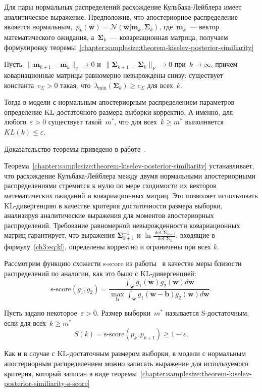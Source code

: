 Для пары нормальных распределений расхождение Кульбака-Лейблера имеет аналитическое выражение. Предположив, что апостериорное распределение является нормальным,~$p_k(\mathbf{w}) = \mathcal{N}\left(\mathbf{w}|\mathbf{m}_k, \mathbf{\Sigma}_k\right)$, где~$\mathbf{m}_k$~--- вектор математического ожидания, а~$\mathbf{\Sigma}_k$~--- ковариационная матрица, получаем формулировку теоремы~\ref{chapter:samplesize:theorem-kiselev-posterior-similiarity}

\begin{theorem}\label{chapter:samplesize:theorem-kiselev-posterior-similiarity}
    Пусть~$\|\mathbf{m}_{k+1} - \mathbf{m}_k\|_2 \to 0$ и~$\|\mathbf{\Sigma}_{k+1} - \mathbf{\Sigma}_k\|_{F}\to 0$ при~$k\to \infty$, причем ковариационные матрицы равномерно невырождены снизу: существует константа~$c_{\Sigma}>0$ такая, что~$\lambda_{\min}(\mathbf{\Sigma}_k)\ge c_{\Sigma}$ для всех~$k$.

    Тогда в модели с нормальным апостериорным распределением параметров определение KL-достаточного размера выборки корректно.
    А именно, для любого~$\varepsilon > 0$ существует такой~$m^*$, что для всех~$k\geqslant m^*$ выполняется~$KL(k)\leqslant\varepsilon$.
\end{theorem}
Доказательство теоремы приведено в работе~\cite{grabovoi2025sample727559461}.

Теорема~\ref{chapter:samplesize:theorem-kiselev-posterior-similiarity} устанавливает, что расхождение Кульбака-Лейблера между двумя нормальными апостериорными распределениями стремится к нулю по мере сходимости их векторов математических ожиданий и ковариационных матриц. Это позволяет использовать KL-дивергенцию в качестве критерия достаточности размера выборки, анализируя аналитические выражения для моментов апостериорных распределений. Требование равномерной невырожденности ковариационных матриц гарантирует, что выражения $\mathbf{\Sigma}_{k+1}^{-1}$ и $\ln\frac{\det\mathbf{\Sigma}_{k+1}}{\det\mathbf{\Sigma}_k}$, входящие в формулу~\eqref{ch3:eq:kl}, определены корректно и ограничены при всех $k$.

Рассмотрим функцию схожести s-score из работы~\cite{aduenko2017} в качестве меры близости распределений по аналогии, как это было с KL-дивергенцией:
\[
    \text{s-score}(g_1, g_2) = \frac{\int_{\mathbf{w}} g_1(\mathbf{w}) g_2(\mathbf{w}) d\mathbf{w}}{\max_{\mathbf{b}} \int_{\mathbf{w}} g_1(\mathbf{w} - \mathbf{b}) g_2(\mathbf{w}) d\mathbf{w}}.
\]
\begin{definition}
    Пусть задано некоторое~$\varepsilon > 0$.
    Размер выборки~$m^*$ называется S-достаточным, если для всех~$k\geqslant m^*$
    \[
        S(k) = \text{s-score}(p_k, p_{k+1}) \geqslant 1-\varepsilon.
    \]
\end{definition}
Как и в случае с KL-достаточным размером выборки, в модели с нормальным апостериорным распределением можно записать выражение для используемого критерия, который записан в виде теоремы~\ref{chapter:samplesize:theorem-kiselev-posterior-similiarity-s-score}

